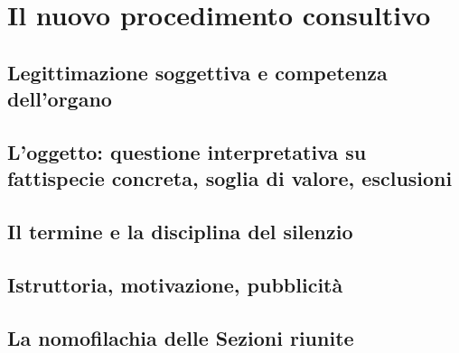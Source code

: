 
\chapter{Il nuovo procedimento consultivo}
\label{cap:cap4}

\section{Legittimazione soggettiva e competenza dell'organo}
\label{sez:cap4:legittimazione}


\section{L'oggetto: questione interpretativa su fattispecie concreta, soglia di valore, esclusioni}
\label{sez:cap4:oggetto}


\section{Il termine e la disciplina del silenzio}
\label{sez:cap4:termine}


\section{Istruttoria, motivazione, pubblicità}
\label{sez:cap4:istruttoria}


\section{La nomofilachia delle Sezioni riunite}
\label{sez:cap4:nomofilachia}


